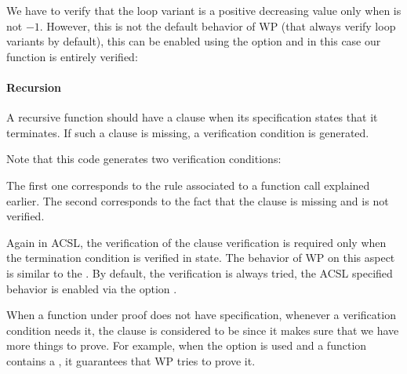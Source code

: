 

We have to verify that the loop variant is a positive decreasing value only
when  is not $-1$. However, this is not the default
behavior of WP (that always verify loop variants by default), this can
be enabled using the option  and
in this case our function is entirely verified:




\paragraph{Recursion}


A recursive function should have a  clause when its
specification states that it terminates. If such a clause is missing, a
verification condition  is generated.




Note that this code generates two verification conditions:




The first one corresponds to the rule associated to a function call explained
earlier. The second corresponds to the fact that the 
clause is missing and is not verified.


Again in ACSL, the verification of the  clause
verification is required only when the termination condition is verified in
 state. The behavior of WP on this aspect is similar to the
. By default, the verification is always tried, the
ACSL specified behavior is enabled via the option
.




\begin{Information}
  When a function under proof does not have 
  specification, whenever a verification condition needs it, the clause is
  considered to be  since it makes sure that
  we have more things to prove. For example, when the option
   is used and a function contains a
  , it guarantees that WP tries to prove it.
\end{Information}


